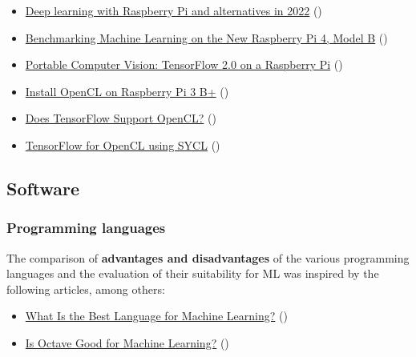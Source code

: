 \documentclass [oneside,10pt,a4paper,ngerman,BCOR10mm,headsepline,parindent,final]{scrartcl}
\providecommand{\tightlist}{%
      \setlength{\itemsep}{0pt}\setlength{\parskip}{0pt}}
\begin{document}
\begin{itemize}
\tightlist
\item
  \href{https://qengineering.eu/deep-learning-with-raspberry-pi-and-alternatives.html}{Deep
  learning with Raspberry Pi and alternatives in 2022}
  (\cite{DL_Raspi_2022})
\item
  \href{https://www.hackster.io/news/benchmarking-machine-learning-on-the-new-raspberry-pi-4-model-b-88db9304ce4}{Benchmarking
  Machine Learning on the New Raspberry Pi 4, Model B}
  (\cite{ML_Raspi4_2019})
\item
  \href{https://towardsdatascience.com/portable-computer-vision-tensorflow-2-0-on-a-raspberry-pi-part-1-of-2-84e318798ce9}{Portable
  Computer Vision: TensorFlow 2.0 on a Raspberry Pi}
  (\cite{TF2_Raspi4_2019})
\item
  \href{https://qengineering.eu/install-opencl-on-raspberry-pi-3.html}{Install
  OpenCL on Raspberry Pi 3 B+} (\cite{OpenCL_Raspi_2022})
\item
  \href{https://indiantechwarrior.com/does-tensorflow-support-opencl/}{Does
  TensorFlow Support OpenCL?} (\cite{TF_OpenCL_2022})
\item
  \href{https://www.codeplay.com/portal/blogs/2016/06/01/tensorflow-for-opencl-using-sycl.html}{TensorFlow
  for OpenCL using SYCL} (\cite{TF_OpenCL_SYCL_2016})
\end{itemize}

    \hypertarget{software}{%
\subsection{Software}\label{software}}

    \hypertarget{programming-languages}{%
\subsubsection{Programming languages}\label{programming-languages}}

The comparison of \textbf{advantages and disadvantages} of the various
programming languages and the evaluation of their suitability for ML was
inspired by the following articles, among others:

\begin{itemize}
\tightlist
\item
  \href{https://www.springboard.com/blog/data-science/best-language-for-machine-learning/}{What
  Is the Best Language for Machine Learning?}
  (\cite{ML_bestLanguage_2021})
\item
  \href{https://datasciencenerd.com/is-octave-good-for-machine-learning/}{Is
  Octave Good for Machine Learning?} (\cite{Octave_for_ML_2021})
\end{itemize}
\end{document}
